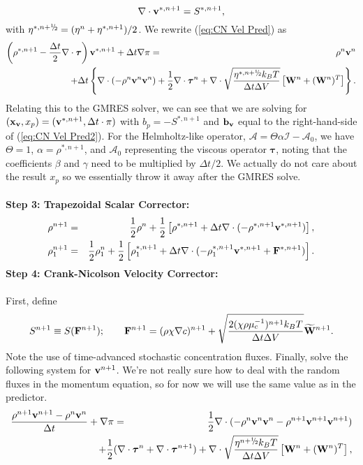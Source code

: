 \documentclass[final]{siamltex}
\newcommand{\sfrac}[2]{\mathchoice
  {\kern0em\raise.5ex\hbox{\the\scriptfont0 #1}\kern-.15em/
   \kern-.15em\lower.25ex\hbox{\the\scriptfont0 #2}}
  {\kern0em\raise.5ex\hbox{\the\scriptfont0 #1}\kern-.15em/
   \kern-.15em\lower.25ex\hbox{\the\scriptfont0 #2}}
  {\kern0em\raise.5ex\hbox{\the\scriptscriptfont0 #1}\kern-.2em/
   \kern-.15em\lower.25ex\hbox{\the\scriptscriptfont0 #2}}
  {#1\!/#2}}
\def\bb {{\bf b}}
\def\Fb {{\bf F}}
\def\vb {{\bf v}}
\def\Wb {{\bf W}}
\def\xb {{\bf x}}
\def\taub {\boldsymbol{\tau}}
\def\half   {\frac{1}{2}}
\def\myhalf {\sfrac{1}{2}}
\begin{document}
\begin{equation}
\nabla\cdot\vb^{*,n+1} = S^{*,n+1},
\end{equation}
with $\eta^{*,n+\myhalf} = (\eta^n + \eta^{*,n+1})/2$.
We rewrite (\ref{eq:CN Vel Pred}) as
\begin{eqnarray}
\left(\rho^{*,n+1} - \frac{\Delta t}{2}\nabla\cdot\taub\right)\vb^{*,n+1} + \Delta t\nabla\pi &=& \rho^n\vb^n\nonumber\\
&&\hspace{-1.5in}+ \Delta t\left\{\nabla\cdot(-\rho^n\vb^n\vb^n) + \half\nabla\cdot\taub^n + \nabla\cdot\sqrt{\frac{\eta^{*,n+\myhalf} k_B T}{\Delta t\Delta V}}\left[\Wb^n + (\Wb^n)^T\right]\right\}.\label{eq:CN Vel Pred2}
\end{eqnarray}
Relating this to the GMRES solver, we can see that we are solving for 
$(\xb_\vb,x_p) = (\vb^{*,n+1},\Delta t\cdot\pi)$ with $b_p = -S^{*,n+1}$ and $\bb_\vb$ equal to the 
right-hand-side of (\ref{eq:CN Vel Pred2}).  For the Helmholtz-like operator, 
$\mathcal{A}=\Theta\alpha\mathcal{I} - \mathcal{A}_0$, we have $\Theta=1$, $\alpha=\rho^{*,n+1}$,
and $\mathcal{A}_0$ representing the viscous operator $\taub$, noting that the coefficients
$\beta$ and $\gamma$ need to be multiplied by $\Delta t/2$.  We actually do not care about
the result $x_p$ so we essentially throw it away after the GMRES solve.\\ \\
{\bf Step 3: Trapezoidal Scalar Corrector:}
\begin{eqnarray}
\rho^{n+1} &=& \half\rho^n + \half\left[\rho^{*,n+1} + \Delta t\nabla\cdot(-\rho^{*,n+1}\vb^{*,n+1})\right],\\
\rho_1^{n+1} &=& \half\rho_1^n + \half\left[\rho_1^{*,n+1} + \Delta t\nabla\cdot(-\rho_1^{*,n+1}\vb^{*,n+1} + \Fb^{*,n+1})\right].
\end{eqnarray}
{\bf Step 4: Crank-Nicolson Velocity Corrector:}\\ \\
First, define
\begin{equation}
S^{n+1} \equiv S(\Fb^{n+1});
\qquad
\Fb^{n+1} = (\rho\chi\nabla c)^{n+1} + \sqrt{\frac{2(\chi\rho\mu_c^{-1})^{n+1}k_BT}{\Delta t\Delta V}}\widetilde\Wb^{n+1}.
\end{equation}
Note the use of time-advanced stochastic concentration fluxes.  Finally, solve 
the following system for $\vb^{n+1}$.  We're not really sure how to deal with the
random fluxes in the momentum equation, so for now we will use the same value as 
in the predictor.
\begin{eqnarray}
\frac{\rho^{n+1}\vb^{n+1} - \rho^n\vb^n}{\Delta t} + \nabla\pi &=& \half\nabla\cdot(-\rho^n\vb^n\vb^n - \rho^{n+1}\vb^{n+1}\vb^{n+1})\nonumber\\
&&\hspace{-0.5in}+ \half(\nabla\cdot\taub^n + \nabla\cdot\taub^{n+1}) + \nabla\cdot\sqrt{\frac{\eta^{n+\myhalf} k_B T}{\Delta t\Delta V}}\left[\Wb^n + (\Wb^n)^T\right],\label{eq:CN Vel Corr}
\end{eqnarray}
\end{document}

